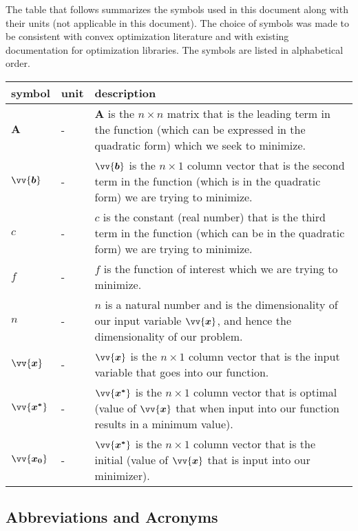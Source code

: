 \documentclass[12pt]{article}
\begin{document}
The table that follows summarizes the symbols used in this document along with
their units (not applicable in this document).  The choice of symbols was made to be consistent with convex optimization literature and with existing documentation for optimization libraries.  The symbols are listed in alphabetical order.

\renewcommand{\arraystretch}{1.2}
\noindent \begin{longtable*}{l l p{12cm}} \toprule
\textbf{symbol} & \textbf{unit} & \textbf{description}\\
\midrule 
$\mathbf{A}$ & \si[per-mode=symbol] {-} & $\mathbf{A}$ is the $n \times n$ matrix that is the leading term in the function (which can be expressed in the quadratic form) which we seek to minimize.
\\
$\vv{\bm{b}}$ & \si[per-mode=symbol] {-} & $\vv{\bm{b}}$ is the $n \times 1$ column vector that is the second term in the function (which is in the quadratic form) we are trying to minimize. 
\\ 
$c$ & \si[per-mode=symbol] {-} & $c$ is the constant (real number) that is the third term in the function (which can be in the quadratic form) we are trying to minimize.
\\
$f$ & \si[per-mode=symbol] {-} & $f$ is the function of interest which we are trying to minimize.  
\\
$n$ & \si[per-mode=symbol] {-} & $n$ is a natural number and is the dimensionality of our input variable $\vv{\bm{x}}$, and hence the dimensionality of our problem. 
\\
$\vv{\bm{x}}$ & \si[per-mode=symbol] {-} & $\vv{\bm{x}}$ is the $n \times 1$ column vector that is the input variable that goes into our function.
\\
$\vv{\bm{x^*}}$ & \si[per-mode=symbol] {-} & $\vv{\bm{x^*}}$ is the $n \times 1$ column vector that is optimal (value of $\vv{\bm{x}}$ that when input into our function results in a minimum value).
\\
$\vv{\bm{x_0}}$ & \si[per-mode=symbol] {-} & $\vv{\bm{x^*}}$ is the $n \times 1$ column vector that is the initial (value of $\vv{\bm{x}}$ that is input into our minimizer).
\\
\bottomrule
\end{longtable*}

\subsection{Abbreviations and Acronyms}
\end{document}
